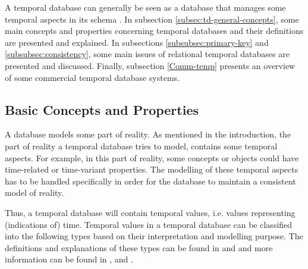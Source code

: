 %
%
A temporal database can generally be seen as a database that manages some temporal aspects in its schema \cite{etzion1998}. In subsection \ref{subsec:td-general-concepts}, some main concepts and properties concerning temporal databases and their definitions are presented and explained. In subsections \ref{subsubsec:primary-key} and \ref{subsubsec:consistency}, some main issues of relational temporal databases are presented and discussed. Finally, subsection \ref{Comm-temp} presents an overview of some commercial temporal database systems.

\subsection{\label{subsec:td-general-concepts}Basic Concepts and Properties}
A database models some part of reality. As mentioned in the introduction, the part of reality a temporal database tries to model, contains some temporal aspects. For example, in this part of reality, some concepts or objects could have time-related or time-variant properties. The modelling of these temporal aspects has to be handled specifically in order for the database to maintain a consistent model of reality.

Thus, a temporal database will contain temporal values, i.e. values representing (indications of) time. Temporal values in a temporal database can be classified into the following types based on their interpretation and modelling purpose. The definitions and explanations of these types can be found in \cite{Dyreson1994} and \cite{Nascimento95decisiontime} and more information can be found in \cite{Jensen:1991:IIM:627283.627484}, \cite{Snodgrass:1984:TQL:588011.588041} and \cite{Nascimento95decisiontime}.

